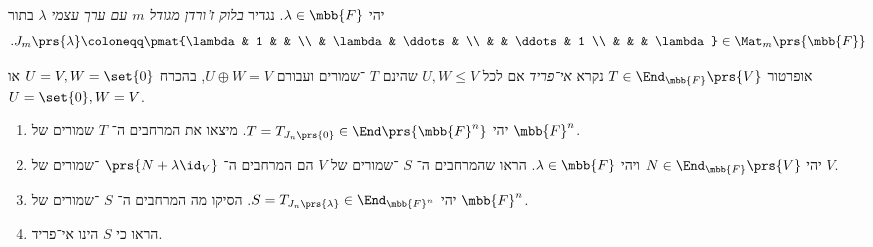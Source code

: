 \documentclass[a4paper,10pt,twoside,openany]{book}
\begin{document}
\begin{definition}
יהי
$\lambda \in \mbb{F}$.
נגדיר
\emph{בלוק ז'ורדן מגודל
$m$
עם ערך עצמי
$\lambda$}
בתור
\begin{align*}
\text{.} J_m\prs{\lambda} \coloneqq \pmat{\lambda & 1 & & \\ & \lambda & \ddots & \\ & & \ddots & 1 \\ & & & \lambda} \in \Mat_m\prs{\mbb{F}}
\end{align*}
\end{definition}

\begin{definition}
אופרטור
$T \in \End_{\mbb{F}}\prs{V}$
נקרא
\emph{אי־פריד}
אם לכל
$U,W \leq V$
שהינם
$T$%
־שמורים ועבורם
$U \oplus W = V$,
בהכרח
$U = V, W = \set{0}$
או
$U = \set{0}, W = V$.
\end{definition}

\begin{exercisechap}\label{exercise:jordan_invariant}
\begin{enumerate}
\item יהי
$T = T_{J_n\prs{0}} \in \End\prs{\mbb{F}^n}$.
מיצאו את המרחבים ה־%
$T$
שמורים של
$\mbb{F}^n$.

\item יהי
$N \in \End_{\mbb{F}}\prs{V}$
ויהי
$\lambda \in \mbb{F}$.
הראו שהמרחבים ה־%
$S$
־שמורים של
$V$
הם המרחבים ה־%
$\prs{N + \lambda \id_V}$
־שמורים של
$V$.

\item יהי
$S = T_{J_n\prs{\lambda}} \in \End_{\mbb{F}^n}$.
הסיקו מה המרחבים ה־%
$S$%
־שמורים של
$\mbb{F}^n$.

\item
הראו כי
$S$
הינו אי־פריד.
\end{enumerate}
\end{exercisechap}
\end{document}
